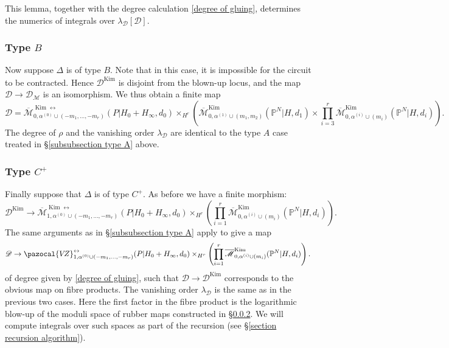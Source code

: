 \documentclass[11pt]{amsart}
\newcommand{\Kim}{\operatorname{Kim}}
\newcommand{\PP}{\mathbb P}
\newcommand{\VZ}{\pazocal{V\!Z}}
\renewcommand{\to}{\rightarrow}
\newcommand{\Mcal}{\mathcal{M}}
\newcommand{\Dcal}{\mathcal{D}}
\newcommand{\ol}[1]{\overline{#1}}
\theoremstyle{definition}
\theoremstyle{definition}
\begin{document}
\noindent This lemma, together with the degree calculation \eqref{degree of gluing}, determines the numerics of integrals over $\lambda_\Dcal [\Dcal]$.

\subsubsection{Type $B$}
Now suppose $\Delta$ is of type $B$. Note that in this case, it is impossible for the circuit to be contracted. Hence $\Dcal^{\Kim}$ is disjoint from the blown-up locus, and the map $\Dcal \to \Dcal_\Mcal$ is an isomorphism. We thus obtain a finite map
\begin{equation*} \Dcal = \ol\Mcal^{\Kim \leftrightarrow}_{0,\alpha^{(0)}\cup(-m_1,\ldots,-m_r)}(P|H_0+H_\infty,d_0)\times_{H^r}\left(\ol\Mcal^{\Kim}_{0,\alpha^{(1)}\cup(m_1,m_2)}(\PP^N|H,d_1)\times\prod_{i=3}^r \ol\Mcal^{\Kim}_{0,\alpha^{(i)}\cup(m_i)}(\PP^N|H,d_i)\right).\end{equation*}
The degree of $\rho$ and the vanishing order $\lambda_\Dcal$ are identical to the type $A$ case treated in \S \ref{subsubsection type A} above.

\subsubsection{Type $C^+$} Finally suppose that $\Delta$ is of type $C^+$. As before we have a finite morphism:
\begin{equation*} \Dcal^{\Kim} \to \ol\Mcal^{\Kim \leftrightarrow}_{1,\alpha^{(0)}\cup(-m_1,\ldots,-m_r)}(P|H_0+H_\infty,d_0) \times_{H^r} \left( \prod_{i=1}^r \ol\Mcal^{\Kim}_{0,\alpha^{(i)}\cup(m_i)}(\PP^N|H,d_i) \right). \end{equation*}
The same arguments as in \S \ref{subsubsection type A} apply to give a map
\begin{equation*}\Dcal \to \VZ^{\leftrightarrow}_{1,\alpha^{(0)}\cup(-m_1,\ldots,-m_r)}(P|H_0+H_\infty,d_0) \times_{H^r} \left( \prod_{i=1}^r \ol\Mcal^{\Kim}_{0,\alpha^{(i)}\cup(m_i)}(\PP^N|H,d_i) \right). \end{equation*}
of degree given by \eqref{degree of gluing}, such that $\Dcal \to \Dcal^{\Kim}$ corresponds to the obvious map on fibre products. The vanishing order $\lambda_\Dcal$ is the same as in the previous two cases. Here the first factor in the fibre product is the logarithmic blow-up of the moduli space of rubber maps constructed in \S \ref{}. We will compute integrals over such spaces as part of the recursion (see \S \ref{section recursion algorithm}).\newpage
\end{document}
